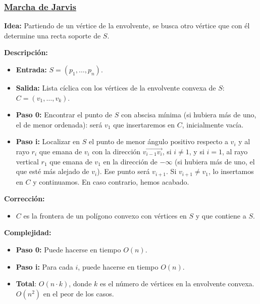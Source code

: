 \documentclass[twoside]{report}
\begin{document}
\subsubsection{\underline{Marcha de Jarvis}}

{\bf Idea:} Partiendo de un vértice de la envolvente, se
busca otro vértice que con él determine una recta soporte de $S$.

\vspace{0.5cm}

{\bf Descripción:}
\begin{itemize}
  \item \textbf{Entrada:} $S=(p_1,\dots,p_n)$.
  \item \textbf{Salida:} Lista cíclica con los vértices de la envolvente
convexa de $S$: $C=(v_1,\dots,v_k)$.
  \item \textbf{Paso 0:} Encontrar el punto de $S$ con abscisa mínima (si
hubiera más de uno, el de menor ordenada): será $v_1$ que
insertaremos en $C$, inicialmente vacía.
  \item \textbf{Paso i:} Localizar en $S$ el punto de menor ángulo positivo
respecto a $v_i$ y al rayo $r_i$ que emana de $v_i$ con la
dirección $\overrightarrow{v_{i-1}v_i}$, si $i\neq 1$, y si $i=1$,
al rayo vertical $r_1$ que emana de $v_1$ en la dirección de
$-\infty$ (si hubiera más de uno, el que esté más alejado de
$v_i$). Ese punto será $v_{i+1}$. Si $v_{i+1}\neq v_1$, lo
insertamos en $C$ y continuamos. En caso contrario, hemos acabado.
\end{itemize}

{\bf Corrección:}

\begin{itemize}
  \item $C$ es la frontera de un polígono convexo con vértices en
$S$ y que contiene a $S$.
\end{itemize}


{\bf Complejidad:}

\begin{itemize}
  \item \textbf{Paso 0:} Puede hacerse en tiempo $O(n)$.
  \item \textbf{Paso i:} Para cada $i$, puede hacerse en tiempo $O(n)$.
  \item \textbf{Total}: $O(n\cdot k)$, donde $k$ es el número de vértices en la
envolvente convexa. $O(n^2)$ en el peor de los casos.
\end{itemize}
\end{document}

